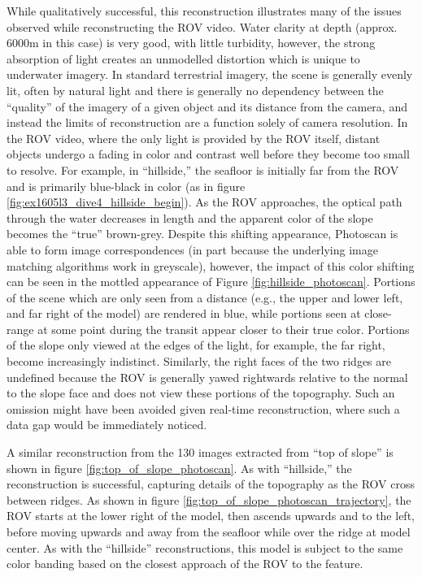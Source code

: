 \documentclass[letterpaper,12pt]{article}
\begin{document}
While qualitatively successful, this reconstruction illustrates many of the issues observed while reconstructing the ROV video.    Water clarity at depth (approx. 6000m in this case) is very good, with little turbidity, however, the strong absorption of light creates an unmodelled distortion which is unique to underwater imagery.   In standard terrestrial imagery, the scene is generally evenly lit, often by natural light and there is generally no dependency between the ``quality'' of the imagery of a given object and its distance from the camera, and instead the limits of reconstruction are a function solely of camera resolution.   In the ROV video, where the only light is provided by the ROV itself, distant objects undergo a fading in color and contrast well before they become too small to resolve.   For example, in ``hillside,'' the seafloor is initially far from the ROV and is primarily blue-black in color (as in figure \ref{fig:ex1605l3_dive4_hillside_begin}).  As the ROV approaches, the optical path through the water decreases in length and the apparent color of the slope becomes the ``true'' brown-grey.   Despite this shifting appearance, Photoscan is able to form image correspondences (in part because the underlying image matching algorithms work in greyscale), however, the impact of this color shifting can be seen in the mottled appearance of Figure \ref{fig:hillside_photoscan}. 
Portions of the scene which are only seen from a distance (e.g., the upper and lower left, and far right of the model) are rendered in blue, while portions seen at close-range at some point during the transit appear closer to their true color.   Portions of the slope only viewed at the edges of the light, for example, the far right, become increasingly indistinct.  Similarly, the right faces of the two ridges are undefined because the ROV is generally yawed rightwards relative to the normal to the slope face and does not view these portions of the topography.     Such an omission might have been avoided given real-time reconstruction, where such a data gap would be immediately noticed.

A similar reconstruction from the 130 images extracted from ``top of slope'' is shown in figure \ref{fig:top_of_slope_photoscan}.  As with ``hillside,'' the reconstruction is successful, capturing details of the topography as the ROV cross between ridges.   As shown in figure \ref{fig:top_of_slope_photoscan_trajectory}, the ROV starts at the lower right of the model, then ascends upwards and to the left, before moving upwards and away from the seafloor while over the ridge at model center.  As with the ``hillside'' reconstructions, this model is subject to the same color banding based on the closest approach of the ROV to the feature.
\end{document}
